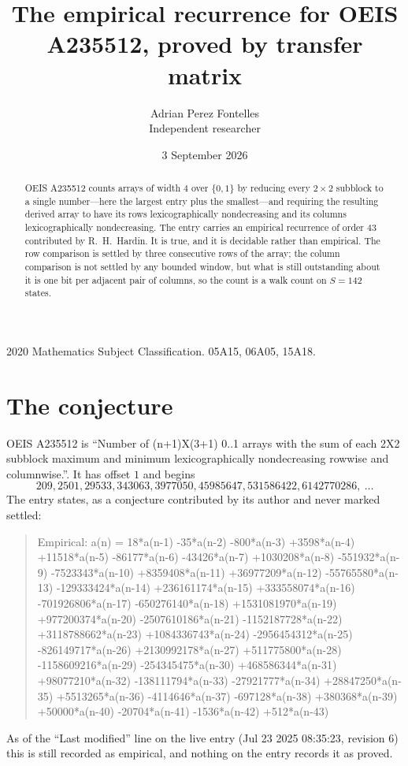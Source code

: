 \documentclass[11pt,a4paper]{article}
\title{The empirical recurrence for OEIS A235512, proved by transfer matrix}
\author{Adrian Perez Fontelles\\ \small Independent researcher}
\date{3 September 2026}
\theoremstyle{plain}
\theoremstyle{definition}
\begin{document}
\maketitle

\begin{abstract}
OEIS A235512 counts arrays of width $4$ over $\{0,1\}$ by reducing every $2\times2$ subblock to a
single number---here the largest entry plus the smallest---and requiring the resulting derived array to have its rows
lexicographically nondecreasing and its columns lexicographically nondecreasing. The entry carries an
empirical recurrence of order $43$ contributed by R.~H.~Hardin. It is true, and it is
decidable rather than empirical. The row comparison is settled by three consecutive rows of the
array; the column comparison is not settled by any bounded window, but what is still outstanding
about it is one bit per adjacent pair of columns, so the count is a walk count on $S=142$
states.
\end{abstract}

\noindent\small 2020 Mathematics Subject Classification. 05A15, 06A05, 15A18.\normalsize

\section{The conjecture}

OEIS A235512 is ``Number of (n+1)X(3+1) 0..1 arrays with the sum of each 2X2 subblock maximum and minimum lexicographically nondecreasing rowwise and columnwise.''. It has offset $1$ and begins
\[
209, 2501, 29533, 343063, 3977050, 45985647, 531586422, 6142770286,\ \dots
\]
The entry states, as a conjecture contributed by its author and never marked settled:
\begin{quote}
Empirical: a(n) = 18*a(n-1) -35*a(n-2) -800*a(n-3) +3598*a(n-4) +11518*a(n-5) -86177*a(n-6) -43426*a(n-7) +1030208*a(n-8) -551932*a(n-9) -7523343*a(n-10) +8359408*a(n-11) +36977209*a(n-12) -55765580*a(n-13) -129333424*a(n-14) +236161174*a(n-15) +333558074*a(n-16) -701926806*a(n-17) -650276140*a(n-18) +1531081970*a(n-19) +977200374*a(n-20) -2507610186*a(n-21) -1152187728*a(n-22) +3118788662*a(n-23) +1084336743*a(n-24) -2956454312*a(n-25) -826149717*a(n-26) +2130992178*a(n-27) +511775800*a(n-28) -1158609216*a(n-29) -254345475*a(n-30) +468586344*a(n-31) +98077210*a(n-32) -138111794*a(n-33) -27921777*a(n-34) +28847250*a(n-35) +5513265*a(n-36) -4114646*a(n-37) -697128*a(n-38) +380368*a(n-39) +50000*a(n-40) -20704*a(n-41) -1536*a(n-42) +512*a(n-43)
\end{quote}
As of the ``Last modified'' line on the live entry (Jul 23 2025 08:35:23, revision 6) this is still
recorded as empirical, and nothing on the entry records it as proved.
\end{document}
